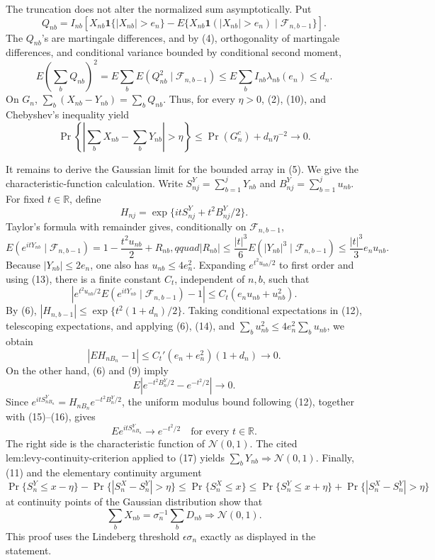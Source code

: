 The truncation does not alter the normalized sum asymptotically. Put
\[
Q_{nb}=I_{nb}\left[X_{nb}\mathbf 1\{|X_{nb}|>e_n\}
-E\{X_{nb}\mathbf 1(|X_{nb}|>e_n)\mid\mathcal F_{n,b-1}\}\right].
\]
The \(Q_{nb}\)'s are martingale differences, and by (4), orthogonality of martingale differences, and conditional variance bounded by conditional second moment,
\[
E\left(\sum_bQ_{nb}\right)^2
=E\sum_bE(Q_{nb}^2\mid\mathcal F_{n,b-1})
\le E\sum_bI_{nb}\lambda_{nb}(e_n)\le d_n.
\tag{10}
\]
On \(G_n\), \(\sum_b(X_{nb}-Y_{nb})=\sum_bQ_{nb}\). Thus, for every \(\eta>0\), (2), (10), and Chebyshev's inequality yield
\[
\Pr\left\{\left|\sum_bX_{nb}-\sum_bY_{nb}\right|>\eta\right\}
\le\Pr(G_n^c)+d_n\eta^{-2}\longrightarrow0.
\tag{11}
\]

It remains to derive the Gaussian limit for the bounded array in (5). We give the characteristic-function calculation. Write
\(S_{nj}^Y=\sum_{b=1}^jY_{nb}\) and \(B_{nj}^Y=\sum_{b=1}^ju_{nb}\). For fixed \(t\in\mathbb R\), define
\[
H_{nj}=\exp\{itS_{nj}^Y+t^2B_{nj}^Y/2\}.
\tag{12}
\]
Taylor's formula with remainder gives, conditionally on \(\mathcal F_{n,b-1}\),
\[
E(e^{itY_{nb}}\mid\mathcal F_{n,b-1})
=1-\frac{t^2u_{nb}}2+R_{nb},qquad
|R_{nb}|\le\frac{|t|^3}{6}E(|Y_{nb}|^3\mid\mathcal F_{n,b-1})
\le\frac{|t|^3}{3}e_nu_{nb}.
\tag{13}
\]
Because \(|Y_{nb}|\le2e_n\), one also has \(u_{nb}\le4e_n^2\). Expanding \(e^{t^2u_{nb}/2}\) to first order and using (13), there is a finite constant \(C_t\), independent of \(n,b\), such that
\[
\left|e^{t^2u_{nb}/2}E(e^{itY_{nb}}\mid\mathcal F_{n,b-1})-1\right|
\le C_t(e_nu_{nb}+u_{nb}^2).
\tag{14}
\]
By (6), \(|H_{n,b-1}|\le\exp\{t^2(1+d_n)/2\}\). Taking conditional expectations in (12), telescoping expectations, and applying (6), (14), and
\(\sum_bu_{nb}^2\le4e_n^2\sum_bu_{nb}\), we obtain
\[
|E H_{nB_n}-1|
\le C_t'(e_n+e_n^2)(1+d_n)\longrightarrow0.
\tag{15}
\]
On the other hand, (6) and (9) imply
\[
E\left|e^{-t^2B_n^Y/2}-e^{-t^2/2}\right|\longrightarrow0.
\tag{16}
\]
Since \(e^{itS_{nB_n}^Y}=H_{nB_n}e^{-t^2B_n^Y/2}\), the uniform modulus bound following (12), together with (15)--(16), gives
\[
E e^{itS_{nB_n}^Y}\longrightarrow e^{-t^2/2}
\quad\text{for every }t\in\mathbb R.
\tag{17}
\]
The right side is the characteristic function of \(\mathcal N(0,1)\). The cited \(\text{lem:levy-continuity-criterion}\) applied to (17) yields
\(\sum_bY_{nb}\Rightarrow\mathcal N(0,1)\). Finally, (11) and the elementary continuity argument
\[
\Pr\{S_n^Y\le x-\eta\}-\Pr\{|S_n^X-S_n^Y|>\eta\}
\le\Pr\{S_n^X\le x\}
\le\Pr\{S_n^Y\le x+\eta\}+\Pr\{|S_n^X-S_n^Y|>\eta\}
\]
at continuity points of the Gaussian distribution show that
\[
\sum_bX_{nb}=\sigma_n^{-1}\sum_bD_{nb}\Rightarrow\mathcal N(0,1).
\]
This proof uses the Lindeberg threshold \(\epsilon\sigma_n\) exactly as displayed in the statement.